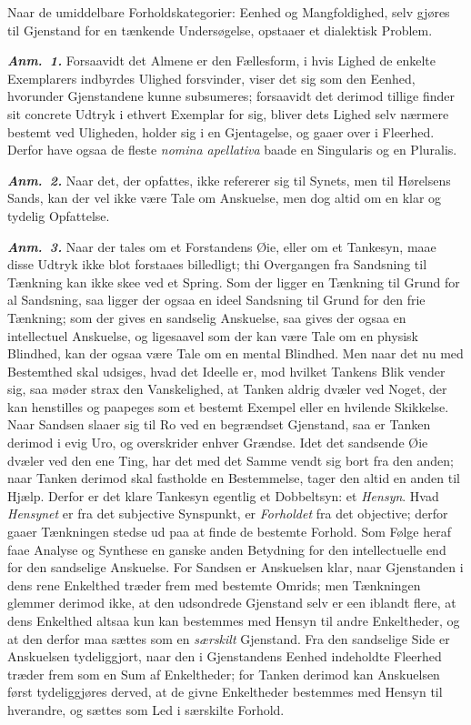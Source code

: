 \documentclass[12pt]{book}
\newcommand{\anm}[1]{\emph{\textbf{Anm.~#1.}}}
\newcommand{\opage}[1]{\marginnote{\footnotesize\textit{[#1]}}}
\begin{document}
Naar de umiddelbare Forholdskategorier: Eenhed og Mangfoldighed, selv gjøres
til Gjenstand for en tænkende Undersøgelse, opstaaer et dialektisk Problem.

\anm{1} Forsaavidt det Almene er den Fællesform, i hvis Lighed de enkelte
Exemplarers indbyrdes Ulighed forsvinder, viser det sig som den Eenhed,
hvorunder Gjenstandene kunne subsumeres; forsaavidt det derimod tillige finder
sit concrete Udtryk i ethvert Exemplar for sig, bliver dets Lighed selv
nærmere bestemt ved Uligheden, holder sig i en Gjentagelse, og gaaer over i
Fleerhed. Derfor have ogsaa de fleste \textit{nomina apellativa} baade en
Singularis og en Pluralis.

\anm{2} Naar det, der opfattes, ikke refererer sig til Synets, men til
Hørelsens Sands, kan der vel ikke være
\opage{11} Tale om Anskuelse, men dog altid om en klar og tydelig Opfattelse.

\anm{3} Naar der tales om et Forstandens Øie, eller om et Tankesyn, maae disse
Udtryk ikke blot forstaaes billedligt; thi Overgangen fra Sandsning til
Tænkning kan ikke skee ved et Spring. Som der ligger en Tænkning til Grund for
al Sandsning, saa ligger der ogsaa en ideel Sandsning til Grund for den frie
Tænkning; som der gives en sandselig Anskuelse, saa gives der ogsaa en
intellectuel Anskuelse, og ligesaavel som der kan være Tale om en physisk
Blindhed, kan der ogsaa være Tale om en mental Blindhed. Men naar det nu med
Bestemthed skal udsiges, hvad det Ideelle er, mod hvilket Tankens Blik vender
sig, saa møder strax den Vanskelighed, at Tanken aldrig dvæler ved Noget, der
kan henstilles og paapeges som et bestemt Exempel eller en hvilende Skikkelse.
Naar Sandsen slaaer sig til Ro ved en begrændset Gjenstand, saa er Tanken
derimod i evig Uro, og overskrider enhver Grændse. Idet det sandsende Øie
dvæler ved den ene Ting, har det med det Samme vendt sig bort fra den anden;
naar Tanken derimod skal fastholde en Bestemmelse, tager den altid en anden
til Hjælp. Derfor er det klare Tankesyn egentlig et Dobbeltsyn: et
\emph{Hensyn}. Hvad \emph{Hensynet} er fra det subjective Synspunkt, er
\emph{Forholdet} fra det objective; derfor gaaer Tænkningen stedse ud paa at
finde de bestemte Forhold. Som Følge heraf faae Analyse og Synthese en ganske
anden Betydning for den intellectuelle end for den sandselige Anskuelse. For
Sandsen er Anskuelsen klar, naar Gjenstanden i dens rene Enkelthed træder frem
med bestemte Omrids; men Tænkningen glemmer derimod ikke, at den udsondrede
Gjenstand selv er een iblandt flere, at dens Enkelthed altsaa kun kan
bestemmes med Hensyn til andre
\opage{12} Enkeltheder, og at den derfor maa sættes som en \emph{særskilt} Gjenstand.
Fra den sandselige Side er Anskuelsen tydeliggjort, naar den i Gjenstandens
Eenhed indeholdte Fleerhed træder frem som en Sum af Enkeltheder; for Tanken
derimod kan Anskuelsen først tydeliggjøres derved, at de givne Enkeltheder
bestemmes med Hensyn til hverandre, og sættes som Led i særskilte Forhold.
\end{document}
